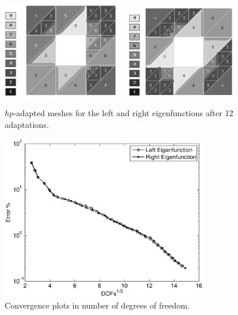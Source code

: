 \documentclass[smallextended]{svjour3}
\begin{document}
\begin{figure}[!ht]
\begin{center}
\includegraphics[width=0.45\textwidth]{hole_mesh1.eps}\ \ \ 
\includegraphics[width=0.42\textwidth]{hole_mesh2.eps}
\end{center}
\caption{$hp$-adapted meshes for the left and right eigenfunctions after 12 adaptations.}
\label{fig:hole_mesh_12}
\end{figure}

\begin{figure}[!ht]
\begin{center}
\includegraphics[width=0.8\textwidth]{dofs.eps}
\end{center}
\caption{Convergence plots in number of degrees of freedom.}
\label{fig:conv1}
\end{figure}
\end{document}
